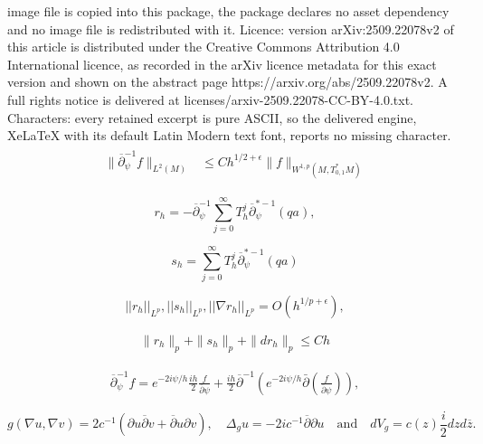 \documentclass[10pt,a4paper]{amsart}
\newcommand {\p} {\partial}
\newcommand{\dbar}{\ol{\p}}
\newcommand{\eps}{\epsilon}
\newcommand{\norm}[1]{\lVert #1 \rVert}
\newcommand{\ol}[1]{\overline{#1}}
\newcommand{\op}{\overline \p}
\newcommand{\oz}{\overline{z}}
\begin{document}
image file is copied into this package, the package declares no asset dependency and no image file is redistributed with it. Licence: version arXiv:2509.22078v2 of this article is distributed under the Creative Commons Attribution 4.0 International licence, as recorded in the arXiv licence metadata for this exact version and shown on the abstract page https://arxiv.org/abs/2509.22078v2. A full rights notice is delivered at licenses/arxiv-2509.22078-CC-BY-4.0.txt. Characters: every retained excerpt is pure ASCII, so the delivered engine, XeLaTeX with its default Latin Modern text font, reports no missing character.
\begin{align}\label{eq:sobo_decayL2}
\begin{split}
 \norm{\overline \p_\psi^{-1}f}_{L^2(M)}&\leq C h^{1/2+\eps}\norm{f}_{W^{1,p}(M, T_{0,1}^*M)} %
 \end{split}
\end{align}

\begin{equation}\label{eq:rh_form}
 r_h=-  \overline{\p}_\psi^{-1}\sum_{j=0}^\infty T_h^j\op_\psi^{*-1}(qa),
\end{equation}

\begin{equation}\label{eq:sh_formula}
s_h=\sum_{j=0}^\infty T_h^j\op_\psi^{*-1}(qa)
\end{equation}

\begin{equation}\label{eq:CZ_rh_norms}
||r_h||_{L^p}, ||s_h||_{L^p},   ||\nabla r_h||_{L^p}=O(h^{1/p+\epsilon}),
\end{equation}

\begin{eqnarray}
\label{eq: no critical point estimate}
\|r_h\|_p +\|s_h\|_p+ \|d r_h\|_p \leq Ch
\end{eqnarray}

\begin{eqnarray}\label{eq: no critical point expansion II} \op_\psi^{-1} f =e^{-2i\psi/h} \frac{ih}{2} \frac{f}{\bar\partial\psi} + \frac{ih}{2}\op^{-1}\left( e^{-2i\psi/h}\bar\partial\left(\frac{f}{\bar\partial\psi}\right)\right),
\end{eqnarray} 

\begin{equation}\label{holomorp_coord}
	g(\nabla u,\nabla v)=2c^{-1}(\p u\dbar v + \dbar u\p v),\quad\Delta_gu = -2ic^{-1}\ol{\p}\p u\quad\text{and}\quad dV_g=c(z)\frac{i}{2}dzd\oz.
\end{equation}
\end{document}
